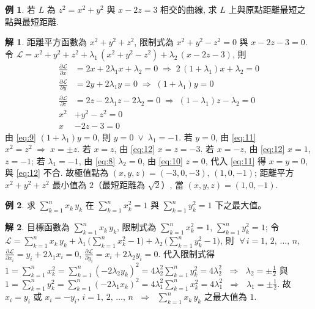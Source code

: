 \documentclass[12pt]{extarticle}
\newcommand{\ds}{\displaystyle}
\newcommand{\ie}{\;\Longrightarrow\;}
\newcommand{\orr}{\;\vee\;}
\theoremstyle{definition}
\newtheorem*{ex}{例}
\newtheorem*{sol}{解}
\newcommand{\pdiff}[2]{\frac{\partial #1}{\partial #2}}
\begin{document}
\begin{ex}
  若 $L$ 為 $z^2 = x^2 + y^2$ 與 $x - 2z = 3$ 相交的曲線, 求 $L$ 上與原點距離最短之點與最短距離. 
\end{ex}

\begin{sol}
  距離平方函數為 $x^2 + y^2 + z^2$, 限制式為 $x^2 + y^2 - z^2 = 0$ 與 $x - 2z - 3 = 0$. 令 $\ds\mathcal{L} = x^2 + y^2 + z^2 + \lambda_1\,(x^2 + y^2 - z^2) + \lambda_2\,(x - 2z - 3)$, 則
  \begin{align}
    \pdiff{\mathcal{L}}{x} &= 2 x + 2\lambda_1 x + \lambda_2 = 0 \ie 2\,(1 + \lambda_1) x + \lambda_2 = 0\label{eq:8}\\
    \pdiff{\mathcal{L}}{y} &= 2 y + 2\lambda_1 y = 0 \ie (1 + \lambda_1)y = 0\label{eq:9} \\
    \pdiff{\mathcal{L}}{z} &= 2 z - 2\lambda_1 z - 2\lambda_2 = 0 \ie (1 - \lambda_1)z - \lambda_2 = 0\label{eq:10}\\
    x^2 &+ y^2 - z^2 = 0 \label{eq:11} \\
    x &- 2z - 3 = 0 \label{eq:12}
  \end{align}
  由 \eqref{eq:9} $(1 + \lambda_1) y = 0$, 則 $y = 0\orr\lambda_1 = -1$. 若 $y = 0$, 由 \eqref{eq:11} $x^2 = z^2 \ie x = \pm z$. 若 $x = z$, 由 \eqref{eq:12} $x = z = -3$. 若 $x = -z$, 由 \eqref{eq:12} $x = 1$, $z = -1$; 若 $\lambda_1 = -1$, 由 \eqref{eq:8} $\lambda_2 = 0$, 由 \eqref{eq:10} $z = 0$, 代入 \eqref{eq:11} 得 $x = y = 0$, 與 \eqref{eq:12} 不合. 故極值點為 $(x, y, z) = (-3, 0, -3),\,(1, 0, -1)$; 距離平方 $x^2 + y^2 + z^2$ 最小值為 $2$（最短距離為 $\sqrt{2}$）, 當 $(x, y, z) = (1, 0, -1)$. 
\end{sol}

\begin{ex}
  求 $\ds\sum_{k = 1}^n x_k\,y_k$ 在 $\ds\sum_{k = 1}^n x_k^2 = 1$ 與 $\ds\sum_{k = 1}^n y_k^2 = 1$ 下之最大值。 
\end{ex}

\begin{sol}
  目標函數為 $\ds\sum_{k = 1}^n x_k\,y_k$, 限制式為 $\ds\sum_{k = 1}^n x_k^2 = 1$, $\ds\sum_{k = 1}^n y_k^2 = 1$; 令 $\ds\mathcal{L} = \ds\sum_{k = 1}^n x_k\,y_k + \lambda_1\,\Big(\sum_{k = 1}^n x_k^2 - 1\Big) + \lambda_2\,\Big(\sum_{k = 1}^n y_k^2 - 1\Big)$, 則 $\;\forall\,i = 1,\,2,\,\ldots,\,n$, $\ds\frac{\partial\mathcal{L}}{\partial x_i} = y_i + 2\lambda_1 x_i = 0$, $\ds\frac{\partial\mathcal{L}}{\partial y_i} = x_i + 2\lambda_2 y_i = 0$. 代入限制式得 $\ds 1 = \sum_{k = 1}^n x_k^2 = \sum_{k = 1}^n(-2\lambda_2 y_k)^2 = 4\lambda_2^2\sum_{k = 1}^n y_k^2 = 4\lambda_2^2$ $\ie$ $\ds\lambda_2 = \pm\frac{1}{2}$ 與 $\ds 1 = \sum_{k = 1}^n y_k^2 = \sum_{k = 1}^n(-2\lambda_1 x_k)^2 = 4\lambda_1^2\sum_{k = 1}^n x_k^2 = 4\lambda_1^2$ $\ie$ $\ds\lambda_1 = \pm\frac{1}{2}$. 故 $x_i = y_i$ 或 $x_i = -y_i$, $i = 1,\,2,\,\ldots,\,n$ $\ie$ $\ds\sum_{k = 1}^n x_k\,y_k$ 之最大值為 $1$.  
\end{sol}
\end{document}

